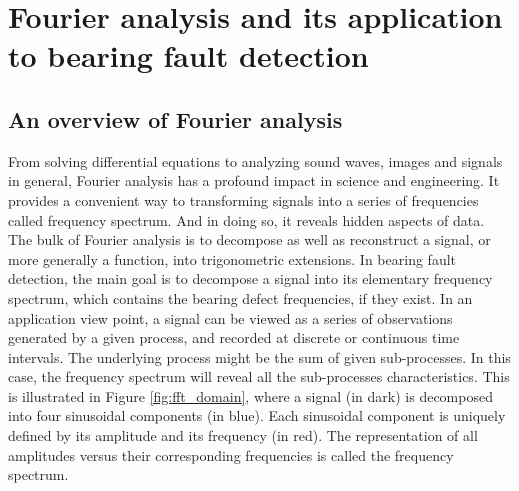 \documentclass[../Main/thesis.tex]{subfiles}
\begin{document}
\chapter[Fourier analysis and its application to bearing fault detection]{Fourier analysis and its application to bearing fault detection}
\label{sec:chapter2}

\section{An overview of Fourier analysis}
From solving differential equations to analyzing sound waves, images and signals in general, Fourier analysis has a profound impact in science and engineering. It provides a convenient way to transforming signals into a series of frequencies called frequency spectrum. And in doing so, it reveals hidden aspects of data. The bulk of Fourier analysis is to decompose as well as reconstruct a signal, or more generally a function, into trigonometric extensions. In bearing fault detection, the main goal is to decompose a signal into its elementary frequency spectrum, which contains the bearing defect frequencies, if they exist. 
\justify
  In an application view point, a signal can be viewed as a series of observations generated by a given process, and recorded at discrete or continuous time intervals. The underlying process might be the sum of given sub-processes. In this case, the frequency spectrum will reveal all the sub-processes characteristics.
This is illustrated in Figure \ref{fig:fft_domain}, where a signal (in dark) is decomposed into four sinusoidal components (in blue). Each sinusoidal component is uniquely defined by its amplitude and its frequency (in red). The representation of all amplitudes versus their corresponding frequencies is called the frequency spectrum.
\end{document}
